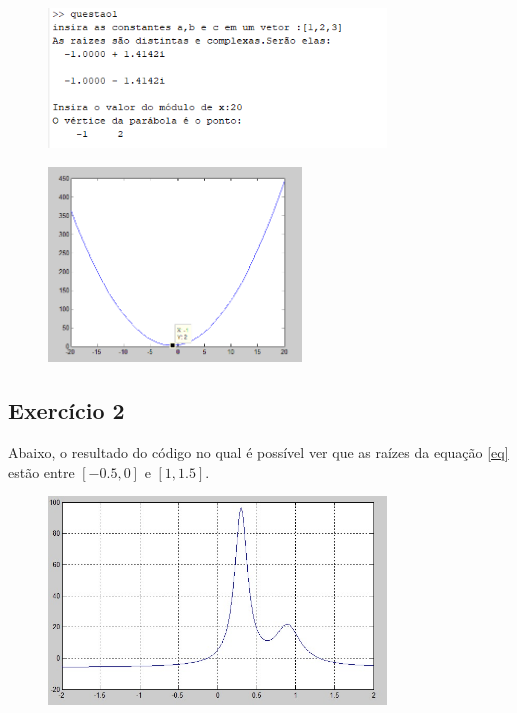 \documentclass[12pt]{article}
\begin{document}
\begin{itemize}
    \begin{figure}[H]
        \begin{center}
            \includegraphics[width=0.8\textwidth]{outputq1-1.png}
        \end{center}
    \end{figure}
    \begin{figure}[H]
        \begin{center}
            \includegraphics[width=0.6\textwidth]{graficoq1-1.png}
        \end{center}
    \end{figure}
\end{itemize}

\subsection{Exercício 2}

Abaixo, o resultado do código no qual é possível ver que as raízes da equação \ref{eq} 
estão entre $[-0.5, 0]$ e $[1, 1.5]$. 
\begin{figure}[H]
    \begin{center}
        \includegraphics[width=0.8\textwidth]{g2.jpeg}
    \end{center}
\end{figure}
\end{document}
